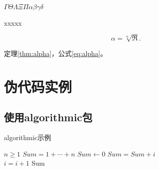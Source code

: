 \begin{sthm}
    $\Gamma\Theta\Lambda\Xi\Pi\alpha\beta\gamma\delta$
\end{sthm}

\begin{thm}
\label{thm:alpha}
    xxxxx
\end{thm}

\begin{equation}
\label{eq:alpha}
    \alpha=\sqrt[n]{\Re}.
\end{equation}
\par 定理\ref{thm:alpha}，公式\ref{eq:alpha}。


\section{伪代码实例}

\subsection{使用algorithmic包}

\begin{algorithm}[!ht]
\caption{algorithmic示例}
\begin{algorithmic}[1] %
    \REQUIRE $n \geq 1$                  %
    \ENSURE $Sum = 1 + \cdots + n$       %
    \STATE $Sum \leftarrow 0$            %
    \ELSE
            \STATE $Sum = Sum + i$\\
            \STATE $i = i + 1$
        \ENDFOR
    \ENDIF
    \RETURN Sum
\end{algorithmic}
\end{algorithm}



